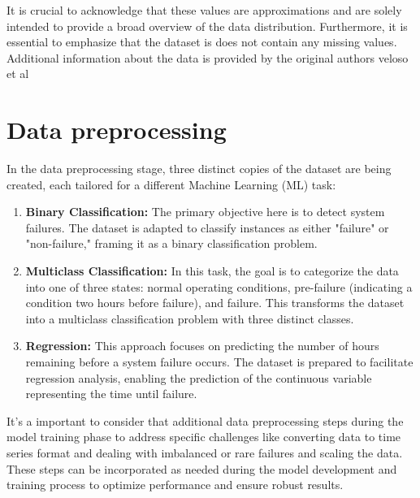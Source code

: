 \documentclass{article}
\begin{document}
It is crucial to acknowledge that these values are approximations and are solely intended to provide a broad overview of the data distribution. Furthermore, it is essential to emphasize that the dataset is does not contain any missing values. Additional information about the data is provided by the original authors veloso et al\cite{Veloso2022}

\newpage

\section{Data preprocessing}

In the data preprocessing stage, three distinct copies of the dataset are being created, each tailored for a different Machine Learning (ML) task:

\begin{enumerate}
    \item \textbf{Binary Classification:} The primary objective here is to detect system failures. The dataset is adapted to classify instances as either "failure" or "non-failure," framing it as a binary classification problem.
    \item \textbf{Multiclass Classification:} In this task, the goal is to categorize the data into one of three states: normal operating conditions, pre-failure (indicating a condition two hours before failure), and failure. This transforms the dataset into a multiclass classification problem with three distinct classes.
    \item \textbf{Regression:} This approach focuses on predicting the number of hours remaining before a system failure occurs. The dataset is prepared to facilitate regression analysis, enabling the prediction of the continuous variable representing the time until failure.
\end{enumerate}

It's a important to consider that additional data preprocessing steps during the model training phase to address specific challenges like converting data to time series format and dealing with imbalanced or rare failures and scaling the data. These steps can be incorporated as needed during the model development and training process to optimize performance and ensure robust results.

\newpage



\end{document}
